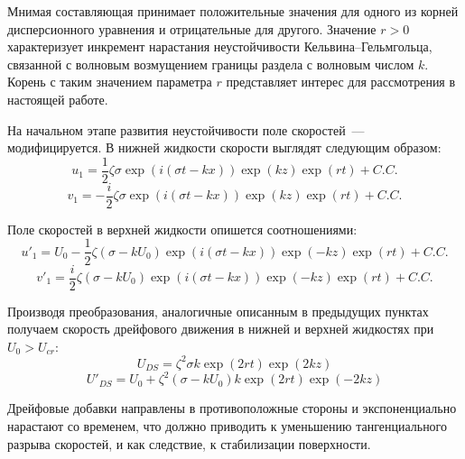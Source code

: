 Мнимая составляющая принимает положительные значения для одного из корней дисперсионного уравнения и отрицательные для другого. Значение $ r>0 $  характеризует инкремент нарастания неустойчивости Кельвина--Гельмгольца, связанной с волновым возмущением границы раздела с волновым числом $ k $. Корень с таким значением параметра $ r $ представляет интерес для рассмотрения в настоящей работе.

На начальном этапе развития неустойчивости поле скоростей~---  модифицируется. В нижней жидкости скорости выглядят следующим образом:
\begin{equation*}
u_{1}=\dfrac{1}{2}\zeta \sigma \exp \left( i \left( \sigma t - k x\right) \right) \exp \left( k z \right) \exp \left( r t\right) +C.C.
\end{equation*}
\begin{equation*}
v_{1}=-\dfrac{i}{2}\zeta \sigma \exp \left( i \left( \sigma t - k x\right) \right) \exp \left( k z \right) \exp \left( r t\right) +C.C.
\end{equation*}
	
Поле скоростей в верхней жидкости опишется соотношениями:
\begin{equation*}
u'_{1}=U_{0}-\dfrac{1}{2}\zeta \left( \sigma-k U_{0}\right) \exp \left( i \left( \sigma t - k x\right) \right) \exp \left(- k z \right) \exp \left( r t\right) +C.C.
\end{equation*}
\begin{equation*}
v'_{1}=\dfrac{i}{2}\zeta \left( \sigma-k U_{0}\right) \exp \left( i \left( \sigma t - k x\right) \right) \exp \left(- k z \right) \exp \left( r t\right) +C.C.
\end{equation*}
	
Производя преобразования, аналогичные описанным в предыдущих пунктах получаем скорость дрейфового движения в нижней и верхней жидкостях при $ U_{0}>U_{cr} $:
\begin{equation*}
U_{DS}=\zeta^{2}\sigma k \exp \left( 2 r t\right) \exp \left( 2 k z \right)
\end{equation*}
\begin{equation*}
U'_{DS}=U_{0}+\zeta^{2} \left( \sigma-k U_{0} \right) k \exp \left( 2 r t\right) \exp \left( -2 k z \right)
\end{equation*}

Дрейфовые добавки  направлены в противоположные стороны и экспоненциально нарастают со временем, что должно приводить к уменьшению тангенциального разрыва скоростей, и как следствие, к стабилизации поверхности. 

